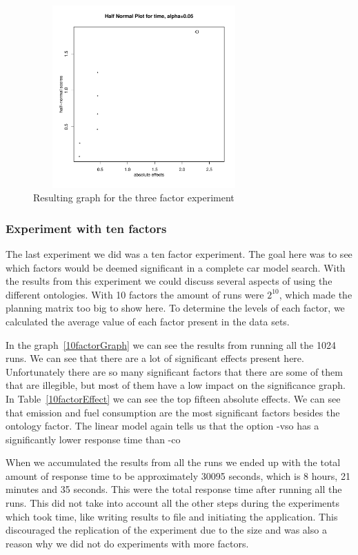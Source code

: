\documentclass{llncs}
\begin{document}
\begin{figure}
 \includegraphics[width=8.5cm, height=7cm]{2factorfinal.pdf}
  \caption{Resulting graph for the three factor experiment}\label{3factorGraph}
\end{figure}


\subsubsection{Experiment with ten factors}
The last experiment we did was a ten factor experiment. The goal here
was to see which factors would be deemed significant in a complete car
model search. With the results from this experiment we could discuss
several aspects of using the different ontologies.   %
With 10 factors the amount of
runs were $2^{10}$, which made the planning matrix too big to show here. 
To determine the levels of each factor, we calculated the average value 
of each factor present in the data sets. 

In the graph~\ref{10factorGraph} we can see the results from running
all the 1024 runs.  We can see that there are a lot of significant
effects present here. 
Unfortunately there are so many significant factors that there are
some of them that are illegible, but most of them have a low impact on
the significance graph.  In Table~\ref{10factorEffect} we can see the top
fifteen absolute effects. We can see that emission and fuel consumption are 
the most significant factors besides the ontology factor.
The linear model again tells us that the option
\textsf{-vso} has a significantly lower response time than
\textsf{-co}

When we accumulated the results from all the runs we ended up with the
total amount of response time to be approximately 30095 seconds, which
is 8 hours, 21 minutes and 35 seconds.  This were the total response
time after running all the runs. This did not take into account all
the other steps during the experiments which took time, like writing
results to file and initiating the application.  This discouraged the
replication of the experiment due to the size and was also a reason
why we did not do experiments with more factors.
\end{document}
